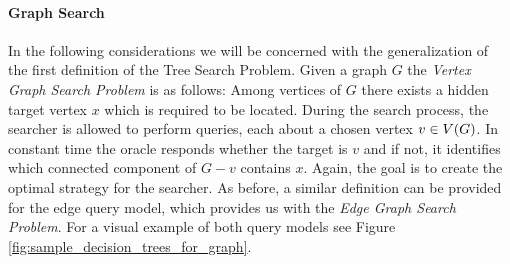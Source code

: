 \paragraph{Graph Search} In the following considerations we will be concerned with the generalization of the first definition of the Tree Search Problem. Given a graph $G$ the \textit{Vertex Graph Search Problem} is as follows: Among vertices of $G$ there exists a hidden target vertex $x$ which is required to be located. During the search process, the searcher is allowed to perform queries, each about a chosen vertex $v\in V\mathopen{}\left( G \right)$. In constant time the oracle responds whether the target is $v$ and if not, it identifies which connected component of $G-v$ contains $x$. Again, the goal is to create the optimal strategy for the searcher. As before, a similar definition can be provided for the edge query model, which provides us with the \textit{Edge Graph Search Problem}. For a visual example of both query models see Figure \ref{fig:sample_decision_trees_for_graph}.




